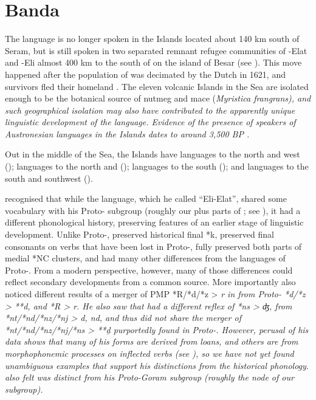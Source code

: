 \chapter{Banda}\label{ch:Ban}
The  language is no longer spoken in the  Islands located
about 140 km south of Seram,
but is still spoken in two separated remnant refugee communities
of -Elat and -Eli almost 400 km to the south of  on the
island of  Besar (see ).
This move happened after the population of  was decimated
by the Dutch in 1621,
and survivors fled their homeland \citep{CollinsKaartinen1998,Collins2003b}.
The eleven volcanic  Islands in the  Sea are isolated
enough to be the botanical source of nutmeg
and mace (\it{Myristica frangrans}),
and such geographical isolation may also have contributed to
the apparently unique linguistic development of the language.
Evidence of the presence of speakers of Austronesian languages
in the  Islands dates to around 3,500 BP \citep{Spriggs2011,Lape2018}.

Out in the middle of the  Sea,
the  Islands have  languages to the north
and west ();  languages
to the north and  ();  languages to the south
(); and  languages to the south and southwest ().

\citet[182--190]{Stresemann1927} recognised that while the 
language, which he called “Eli-Elat”,
shared some vocabulary with his Proto- subgroup (roughly
our  plus parts of ; see ),
it had a different phonological history,
preserving features of an earlier stage of linguistic development.
Unlike Proto-,  preserved historical final *k,
preserved final consonants on verbs that have been lost in Proto-,
fully preserved both parts of medial *NC clusters,
and had many other differences from the languages of Proto-.
From a modern perspective,
however, many of those differences could reflect secondary developments
from a common source.
More importantly \citet[185, 188]{Stresemann1927}
also noticed different results of a merger of PMP *R/*d/*z
> \it{r} in  from Proto- *d/*z > **d,
and *R > \it{r}.
He also saw that  had a different reflex of *ns > \it{ʤ},
from *nt/*nd/*nz/*nj > \it{d,
nd}, and thus did not share the merger of *nt/*nd/*nz/*nj/*ns
> **ḏ purportedly found in Proto-.
However, perusal of his data shows that many of his forms are
derived from  loans,
and others are from morphophonemic processes on inflected verbs
(see ), so we have not yet found unambiguous examples that support his
distinctions from the historical phonology.
\citeauthor{Stresemann1927} also felt  was distinct from his Proto-Goram
subgroup (roughly the  node of our  subgroup).

